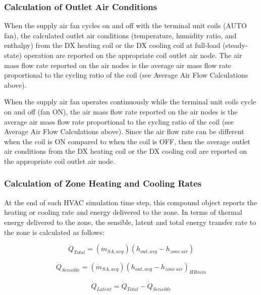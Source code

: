 \subsubsection{Calculation of Outlet Air Conditions}\label{calculation-of-outlet-air-conditions-2}

When the supply air fan cycles on and off with the terminal unit coils (AUTO fan), the calculated outlet air conditions (temperature, humidity ratio, and enthalpy) from the DX heating coil or the DX cooling coil at full-load (steady-state) operation are reported on the appropriate coil outlet air node. The air mass flow rate reported on the air nodes is the average air mass flow rate proportional to the cycling ratio of the coil (see Average Air Flow Calculations above).

When the supply air fan operates continuously while the terminal unit coils cycle on and off (fan ON), the air mass flow rate reported on the air nodes is the average air mass flow rate proportional to the cycling ratio of the coil (see Average Air Flow Calculations above). Since the air flow rate can be different when the coil is ON compared to when the coil is OFF, then the average outlet air conditions from the DX heating coil or the DX cooling coil are reported on the appropriate coil outlet air node.

\subsubsection{Calculation of Zone Heating and Cooling Rates}\label{calculation-of-zone-heating-and-cooling-rates-2}

At the end of each HVAC simulation time step, this compound object reports the heating or cooling rate and energy delivered to the zone. In terms of thermal energy delivered to the zone, the sensible, latent and total energy transfer rate to the zone is calculated as follows:

\begin{equation}
  \dot{Q}_{Total} = \left( \dot{m}_{SA,avg} \right) \left( h_{out,avg} - h_{zone~air} \right)
\end{equation}

\begin{equation}
  \dot{Q}_{Sensible} = \left( \dot{m}_{SA,avg} \right) \left( h_{out,avg} - h_{zone~air} \right)_{HRmin}
\end{equation}

\begin{equation}
  \dot{Q}_{Latent} = \dot{Q}_{Total} - \dot{Q}_{Sensible}
\end{equation}

